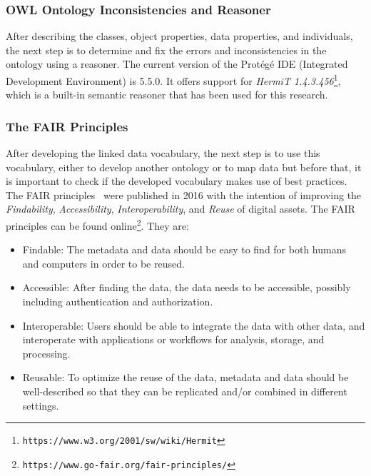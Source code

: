 \begin{doublespace}
\subsubsection{OWL Ontology Inconsistencies and Reasoner}
\label{subsubsec:owlreasoner}

After describing the classes, object properties, data properties, and individuals, 
the next step is to determine and fix the errors and inconsistencies in the ontology 
using a reasoner. 
The current version of the Protégé IDE (Integrated Development Environment) 
is 
5.5.0.
It offers support for \emph{HermiT 1.4.3.456}\footnote{\tt https://www.w3.org/2001/sw/wiki/Hermit}, which is a built-in semantic reasoner that has been used for this research.

\subsubsection{The FAIR Principles}
\label{subsubsec:fairprinciples}

After developing the linked data vocabulary, 
the next step is to use this vocabulary, 
either to develop another ontology or to map data but
before that, 
it is important to check 
if the developed vocabulary makes use of best practices.
The FAIR principles~\cite{fair2016principles} 
were published in 2016 with the intention of improving the {\em Findability},
{\em Accessibility}, {\em Interoperability}, and 
{\em Reuse} of digital assets. 
The FAIR principles can be found online\footnote{\tt https://www.go-fair.org/fair-principles/}. They are:

\begin{itemize}
   
    \item Findable: 
    The metadata and data should be easy to find for both humans and computers in order to be reused.
   
    \item Accessible: 
    After finding the data,
    the data needs to be accessible, possibly including authentication and authorization.
   
    \item Interoperable: 
    Users should be able to integrate the data with other data, and 
    interoperate with applications or workflows 
    for analysis, storage, and processing.
   
    \item Reusable: 
    To optimize the reuse of the data, 
    metadata and data should be well-described 
    so that they can be replicated and/or combined in different settings.


\end{itemize}
\end{doublespace}
